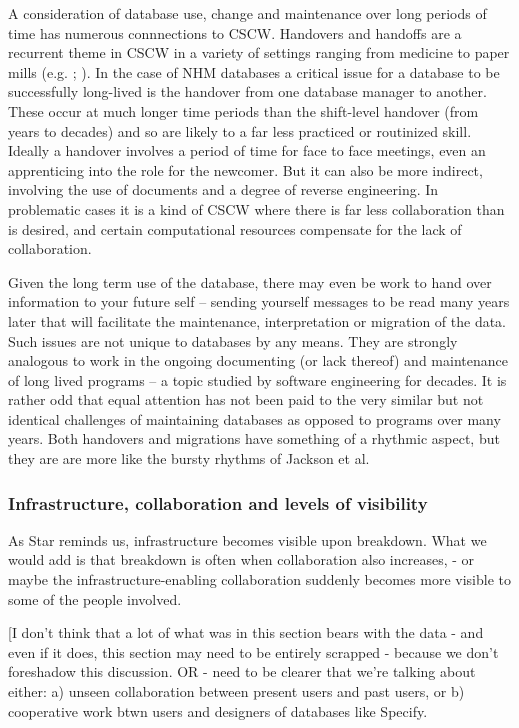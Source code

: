 A consideration of database use, change and maintenance over long periods of time has numerous connnections to CSCW. Handovers and handoffs are a recurrent theme in CSCW in a variety of settings ranging from medicine to paper mills (e.g. \cite{sarcevic2009information};  \cite{auramaki1996paperwork}). In the case of NHM databases a critical issue for a database to be successfully long-lived is the handover from one database manager to another. These occur at much longer time periods than the shift-level handover (from years to decades) and so are likely to a far less practiced or routinized skill. Ideally a handover involves a period of time for face to face meetings, even an apprenticing into the role for the newcomer. But it can also be more indirect, involving the use of documents and a degree of reverse engineering. In problematic cases it is a kind of CSCW where there is far less collaboration than is desired, and certain computational resources compensate for the lack of collaboration. 

Given the long term use of the database, there may even be work to hand over information to your future self – sending yourself messages to be read many years later that will facilitate the maintenance, interpretation or migration of the data. Such issues are not unique to databases by any means. They are strongly analogous to work in the ongoing documenting (or lack thereof) and maintenance of long lived programs – a topic studied by software engineering for decades. It is rather odd that equal attention has not been paid to the very similar but not identical challenges of maintaining databases as opposed to programs over many years. Both handovers and migrations have something of a rhythmic aspect, but they are are more like the bursty rhythms of Jackson et al. \cite{jackson2011collaborative}

\subsubsection{Infrastructure, collaboration and levels of visibility}

As Star reminds us, infrastructure becomes visible upon breakdown. What we would add is that breakdown is often when collaboration also increases, - or maybe the infrastructure-enabling collaboration suddenly becomes more visible to some of the people involved. 

[I don't think that a lot of what was in this section bears with the data - and even if it does, this section may need to be entirely scrapped - because we don't foreshadow this discussion.  OR - need to be clearer that we're talking about either:
a) unseen collaboration between present users and past users, or 
b) cooperative work btwn users and designers of databases like Specify.

